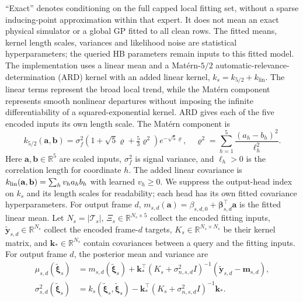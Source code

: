 ``Exact'' denotes conditioning on the full capped local fitting set,
without a sparse inducing-point approximation within that expert. It
does not mean an exact physical simulator or a global GP fitted to all
clean rows. The fitted means, kernel length scales, variances and
likelihood noise are statistical hyperparameters; the queried HB
parameters remain inputs to this fitted model.
The implementation uses
a linear mean and a Mat\'ern-$5/2$ automatic-relevance-determination
(ARD) kernel with an added linear kernel,
$k_s=k_{5/2}+k_{\mathrm{lin}}$.  The linear terms represent the broad
local trend, while the Mat\'ern component represents smooth nonlinear
departures without imposing the infinite differentiability of a
squared-exponential kernel.  ARD gives each of the five encoded inputs
its own length scale.  The Mat\'ern component is
\begin{equation}
\label{eq:matern}
    k_{5/2}(\mathbf{a},\mathbf{b})
    =
    \sigma_f^2
    \left(1+\sqrt{5}\varrho+\tfrac{5}{3}\varrho^2\right)
    e^{-\sqrt{5}\varrho},
    \quad
    \varrho^2=\sum_{h=1}^{5}\frac{(a_h-b_h)^2}{\ell_h^2}.
\end{equation}
Here $\mathbf a,\mathbf b\in\mathbb R^5$ are scaled inputs,
$\sigma_f^2$ is signal variance, and $\ell_h>0$ is the correlation
length for coordinate $h$. The added linear covariance is
$k_{\rm lin}(\mathbf a,\mathbf b)=\sum_h v_h a_hb_h$ with learned
$v_h\geq0$. We suppress the output-head index on $k_s$ and its length scales for
readability; each head has its own fitted covariance hyperparameters.
For output frame $d$,
$m_{s,d}(\mathbf{a})=\beta_{s,d,0}
+\boldsymbol{\beta}_{s,d}^{\top}\mathbf{a}$ is the fitted linear mean.
Let $N_s=|\mathcal{T}_s|$,
$\Xi_s\in\mathbb{R}^{N_s\times5}$ collect the encoded fitting inputs,
$\tilde{\mathbf{y}}_{s,d}\in\mathbb{R}^{N_s}$ collect the encoded
frame-$d$ targets, $K_s\in\mathbb{R}^{N_s\times N_s}$ be their kernel
matrix, and $\mathbf{k}_*\in\mathbb{R}^{N_s}$ contain covariances
between a query and the fitting inputs.
For output frame $d$, the posterior mean and variance are
\begin{align}
\label{eq:gp-predictive}
    \mu_{s,d}(\tilde{\boldsymbol{\xi}}_s)
    &=
    m_{s,d}(\tilde{\boldsymbol{\xi}}_s)
    +\mathbf{k}_*^\top
      (K_s+\sigma_{n,s,d}^2 I)^{-1}
      (\tilde{\mathbf{y}}_{s,d}-\mathbf{m}_{s,d}),
\nonumber\\
    \sigma_{s,d}^2(\tilde{\boldsymbol{\xi}}_s)
    &=
    k_s(\tilde{\boldsymbol{\xi}}_s,\tilde{\boldsymbol{\xi}}_s)
    -
    \mathbf{k}_*^\top
    (K_s+\sigma_{n,s,d}^2 I)^{-1}\mathbf{k}_* .
\end{align}
